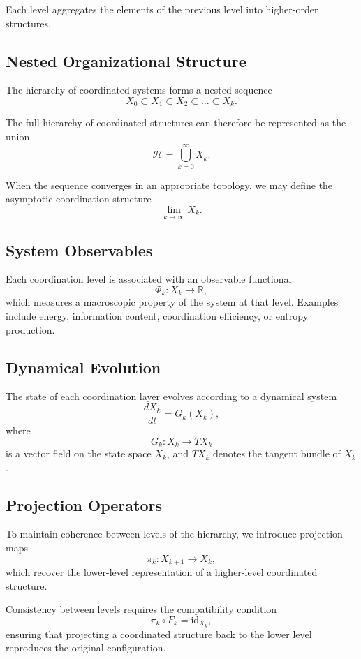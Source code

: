 \documentclass[12pt]{article}
\begin{document}
Each level aggregates the elements of the previous level into higher-order structures.

\subsection{Nested Organizational Structure}

The hierarchy of coordinated systems forms a nested sequence
\[
X_0 \subset X_1 \subset X_2 \subset \dots \subset X_k .
\]

The full hierarchy of coordinated structures can therefore be represented as the union
\[
\mathcal{H} = \bigcup_{k=0}^{\infty} X_k .
\]

When the sequence converges in an appropriate topology, we may define the asymptotic coordination structure
\[
\lim_{k \to \infty} X_k .
\]

\subsection{System Observables}

Each coordination level is associated with an observable functional
\[
\Phi_k : X_k \rightarrow \mathbb{R},
\]
which measures a macroscopic property of the system at that level. Examples include energy, information content, coordination efficiency, or entropy production.

\subsection{Dynamical Evolution}

The state of each coordination layer evolves according to a dynamical system
\[
\frac{dX_k}{dt} = G_k(X_k),
\]
where
\[
G_k : X_k \rightarrow T X_k
\]
is a vector field on the state space $X_k$, and $T X_k$ denotes the tangent bundle of $X_k$.

\subsection{Projection Operators}

To maintain coherence between levels of the hierarchy, we introduce projection maps
\[
\pi_k : X_{k+1} \rightarrow X_k ,
\]
which recover the lower-level representation of a higher-level coordinated structure.

Consistency between levels requires the compatibility condition
\[
\pi_k \circ F_k = \mathrm{id}_{X_k},
\]
ensuring that projecting a coordinated structure back to the lower level reproduces the original configuration.
\end{document}
